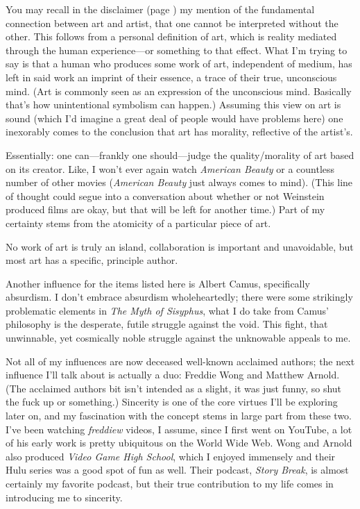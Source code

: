 \documentclass[./butidigress.tex]{subfiles}
\begin{document}
You may recall in the disclaimer (page \pageref{chap:disclaimer}) my mention of the fundamental connection between art and artist, that one cannot be interpreted without the other.
This follows from a personal definition of art, which is reality mediated through the human experience---or something to that effect.
What I'm trying to say is that a human who produces some work of art, independent of medium, has left in said work an imprint of their essence, a trace of their true, unconscious mind.
(Art is commonly seen as an expression of the unconscious mind.
Basically that's how unintentional symbolism can happen.)
Assuming this view on art is sound (which I'd imagine a great deal of people would have problems here) one inexorably comes to the conclusion that art has morality, reflective of the artist's.

Essentially: one can---frankly one should---judge the quality/morality of art based on its creator.
Like, I won't ever again watch \textit{American Beauty} or a countless number of other movies (\textit{American Beauty} just always comes to mind).
(This line of thought could segue into a conversation about whether or not Weinstein produced films are okay, but that will be left for another time.)
Part of my certainty stems from the atomicity of a particular piece of art.

No work of art is truly an island, collaboration is important and unavoidable, but most art has a specific, principle author.

Another influence for the items listed here is Albert Camus, specifically absurdism.
I don't embrace absurdism wholeheartedly; there were some strikingly problematic elements in \textit{The Myth of Sisyphus}, what I do take from Camus' philosophy is the desperate, futile struggle against the void.
This fight, that unwinnable, yet cosmically noble struggle against the unknowable appeals to me.

Not all of my influences are now deceased well-known acclaimed authors; the next influence I'll talk about is actually a duo: Freddie Wong and Matthew Arnold.
(The acclaimed authors bit isn't intended as a slight, it was just funny, so shut the fuck up or something.)
Sincerity is one of the core virtues I'll be exploring later on, and my fascination with the concept stems in large part from these two.
I've been watching \textit{freddiew} videos, I assume, since I first went on YouTube, a lot of his early work is pretty ubiquitous on the World Wide Web.
Wong and Arnold also produced \textit{Video Game High School}, which I enjoyed immensely and their Hulu series was a good spot of fun as well.
Their podcast, \textit{Story Break}, is almost certainly my favorite podcast, but their true contribution to my life comes in introducing me to sincerity.
\end{document}
